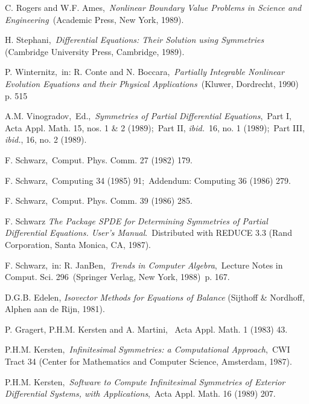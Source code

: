{\begin{thebibliography}{99}
 {\sc C. Rogers} and {\sc W.F. Ames},\, 
{\em Nonlinear Boundary Value Problems in Science and Engineering}\,
(Academic Press, New York, 1989).

 {\sc H. Stephani},\, 
{\em Differential Equations: Their Solution using Symmetries}\,
(Cambridge University Press, Cambridge, 1989).

 {\sc P. Winternitz},\, 
in: R. Conte and N. Boccara,\, {\em Partially Integrable Nonlinear 
Evolution Equations and their Physical Applications}\, 
(Kluwer, Dordrecht, 1990)\, p. 515

 {\sc A.M. Vinogradov},\, Ed.,\,
{\em Symmetries of Partial Differential Equations},\, 
Part I, Acta Appl. Math. 15, nos. 1 \& 2 (1989);\, 
Part II, {\em ibid.}\, 16, no. 1 (1989);\, 
Part III, {\em ibid.}, 16, no. 2 (1989).

 {\sc F. Schwarz},\,
Comput. Phys. Comm. 27 (1982) 179.

 {\sc F. Schwarz},\,
Computing 34 (1985) 91;\, Addendum: Computing 36 (1986) 279.

 {\sc F. Schwarz},\,
Comput. Phys. Comm. 39 (1986) 285.

{\sc F. Schwarz}
{\em The Package SPDE for Determining Symmetries of Partial Differential
Equations. User's Manual}.\, Distributed with REDUCE 3.3 
(Rand Corporation, Santa Monica, CA, 1987).

 {\sc F. Schwarz},\,
in: R. JanBen,\, {\em Trends in Computer Algebra},\,
Lecture Notes in Comput. Sci. 296 \,(Springer Verlag, New York, 1988)\, p. 167.

 {\sc D.G.B. Edelen},
{\em Isovector Methods for Equations of Balance} (Sijthoff \& Nordhoff,
Alphen aan de Rijn, 1981).

 {\sc P. Gragert, P.H.M. Kersten}
and {\sc A. Martini}, \,
Acta Appl. Math. 1 (1983) 43.

 {\sc P.H.M. Kersten},\,
{\em Infinitesimal Symmetries: a Computational Approach},\,
CWI Tract 34 (Center for Mathematics and Computer Science, Amsterdam, 1987).

\newpage

 {\sc P.H.M. Kersten},\,
{\em Software to Compute Infinitesimal Symmetries of Exterior Differential
Systems, with Applications},\,
Acta Appl. Math. 16 (1989) 207.


\end{thebibliography}}
